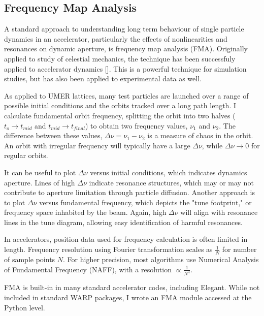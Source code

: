 \subsection{Frequency Map Analysis}

A standard approach to understanding long term behaviour of single particle dynamics in an accelerator, particularly the effects of nonlinearities and resonances on dynamic aperture, is frequency map analysis (FMA). Originally applied to study of celestial mechanics, the technique has been successfuly applied to accelerator dynamics [\cite{Laskar2003}]. This is a powerful technique for simulation studies, but has also been applied to experimental data as well. 

As applied to UMER lattices, many test particles are launched over a range of possible initial conditions and the orbits tracked over a long path length. I calculate fundamental orbit frequency, splitting the orbit into two halves ($t_o \to t_{mid}$ and $t_{mid} \to t_{final}$) to obtain two frequency values, $\nu_1$ and $\nu_2$. The difference between these values, $\Delta \nu = \nu_1-\nu_2$ is a measure of chaos in the orbit. An orbit with irregular frequency will typically have a large $\Delta \nu$, while $\Delta \nu \to 0$ for regular orbits. 

It can be useful to plot $\Delta \nu $ versus initial conditions, which indicates dynamics aperture. Lines of high $\Delta \nu$ indicate resonance structures, which may or may not contribute to aperture limitation through particle diffusion. Another approach is to plot $\Delta \nu $ versus fundamental frequency, which depicts the "tune footprint," or frequency space inhabited by the beam. Again, high $\Delta \nu$ will align with resonance lines in the tune diagram, allowing easy identification of harmful resonances. 

In accelerators, position data used for frequency calculation is often limited in length. Frequency resolution using Fourier transformation scales as $\frac{1}{N}$ for number of sample points $N$. For higher precision, most algorithms use Numerical Analysis of Fundamental Frequency (NAFF), with a resolution $\propto \frac{1}{N^4}$. 




FMA is built-in in many standard accelerator codes, including Elegant. While not included in standard WARP packages, I wrote an FMA module accessed at the Python level. 